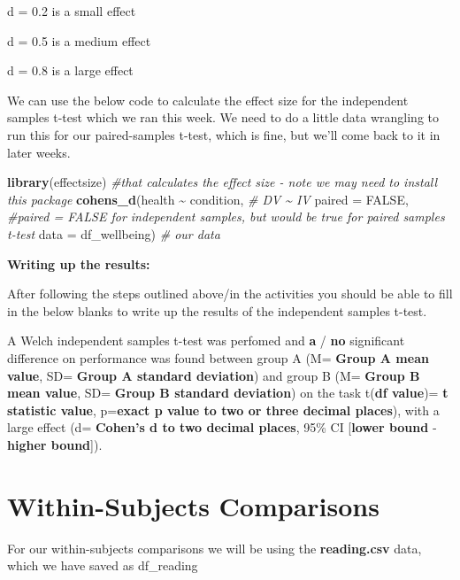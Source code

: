 \documentclass[
]{book}
\newenvironment{Shaded}{\begin{snugshade}}{\end{snugshade}}
\newcommand{\AttributeTok}[1]{\textcolor[rgb]{0.13,0.29,0.53}{#1}}
\newcommand{\CommentTok}[1]{\textcolor[rgb]{0.56,0.35,0.01}{\textit{#1}}}
\newcommand{\ConstantTok}[1]{\textcolor[rgb]{0.56,0.35,0.01}{#1}}
\newcommand{\FunctionTok}[1]{\textcolor[rgb]{0.13,0.29,0.53}{\textbf{#1}}}
\newcommand{\NormalTok}[1]{#1}
\newcommand{\SpecialCharTok}[1]{\textcolor[rgb]{0.81,0.36,0.00}{\textbf{#1}}}
\begin{document}
d = 0.2 is a small effect

d = 0.5 is a medium effect

d = 0.8 is a large effect

We can use the below code to calculate the effect size for the independent samples t-test which we ran this week. We need to do a little data wrangling to run this for our paired-samples t-test, which is fine, but we'll come back to it in later weeks.

\begin{Shaded}
\begin{Highlighting}[]
\FunctionTok{library}\NormalTok{(effectsize) }\CommentTok{\#that calculates the effect size {-} note we may need to install this package}
\FunctionTok{cohens\_d}\NormalTok{(health }\SpecialCharTok{\textasciitilde{}}\NormalTok{ condition, }\CommentTok{\# DV \textasciitilde{} IV}
              \AttributeTok{paired =} \ConstantTok{FALSE}\NormalTok{, }\CommentTok{\#paired = FALSE for independent samples, but would be true for paired samples t{-}test}
              \AttributeTok{data =}\NormalTok{ df\_wellbeing) }\CommentTok{\# our data}
\end{Highlighting}
\end{Shaded}

\textbf{Writing up the results:}

After following the steps outlined above/in the activities you should be able to fill in the below blanks to write up the results of the independent samples t-test.

A Welch independent samples t-test was perfomed and \textbf{a} / \textbf{no} significant difference on performance was found between group A (M= \textbf{Group A mean value}, SD= \textbf{Group A standard deviation}) and group B (M= \textbf{Group B mean value}, SD= \textbf{Group B standard deviation}) on the task t(\textbf{df value})= \textbf{t statistic value}, p=\textbf{exact p value to two or three decimal places}), with a large effect (d= \textbf{Cohen's d to two decimal places}, 95\% CI {[}\textbf{lower bound} ‐ \textbf{higher bound}{]}).

\section{Within-Subjects Comparisons}\label{within-subjects-comparisons}

For our within-subjects comparisons we will be using the \textbf{reading.csv} data, which we have saved as df\_reading
\end{document}

